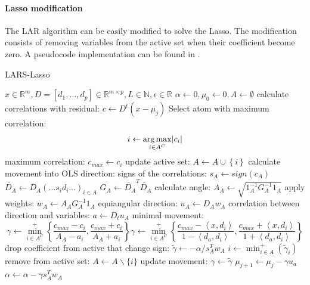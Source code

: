 \paragraph{Lasso modification}
The LAR algorithm can be easily modified to solve the Lasso. 
The modification consists of removing variables from the active set
when their coefficient become zero. A pseudocode implementation can be found in
.
\begin{algorithm}
\caption{LARS-Lasso}
\label{alg:lars}
\begin{algorithmic}[1]
\REQUIRE $x \in \mathbb{R}^m, D =[d_1,...,d_p] \in \mathbb{R}^{m\times p}, L \in
\mathbb{N}, \epsilon \in \mathbb{R}$
\STATE $\alpha \gets 0, \mu_{0} \gets 0, A \gets \emptyset$
\STATE calculate correlations with residual: $c \gets D^t\left( x-\mu_j \right)
$
\STATE Select atom with maximum correlation: 
\begin{equation*}
i \gets \argmax_{i \in A^C} \lvert c_i  \rvert %
\end{equation*}
\STATE maximum correlation: $c_{max} \gets c_i $ %
\STATE update active set: $A \gets A \cup \left\{i\right\} $
\STATE calculate movement into OLS direction:
\STATE signs of the correlations: $s_A \gets  sign\left(c_A\right)$
\STATE $\tilde{D_A} \gets D_A\left(\ldots s_id_i \ldots\right)_{i\in A}$
\STATE $G_A \gets \tilde{D_A}^T\tilde{D_A}$
\STATE calculate angle: $A_A \gets \sqrt{ 1_A^{-1} G_A^{-1} 1_A
}$
\STATE apply weights: $w_A \gets A_AG_A^{-1}1_A$
\STATE equiangular direction: $u_A \gets D_Aw_A$
\STATE correlation between direction and variables: $a \gets D_tu_A$
\STATE minimal movement:
\begin{equation*}
\gamma \gets \min_{i\in A^C}^{+} \left\lbrace \frac{c_{max}-c_i }{A_A-a_i },
\frac{c_{max}+c_i }{A_A+a_i } \right\rbrace
\gamma \gets \min_{i\in A^C}^{+} \left\lbrace \frac{c_{max}-\left< x,d_i
\right> }{1-\left< d_a,d_i \right> }, \frac{c_{max}+\left< x,d_i \right>
}{1+\left< d_a,d_i \right> } \right\rbrace
\end{equation*}
\STATE drop coefficient from active that change sign: 
\STATE $ \tilde{\gamma} \gets -\alpha/s_A^Tw_A  $
\STATE $ i \gets \min_{i\in A}^{+} \left( \tilde{\gamma}_i \right) $
\STATE remove from active set: $ A \gets A \backslash \{i\} $
\STATE update movement: $ \gamma \gets \tilde{\gamma} $  
\ENDIF
\STATE $ \mu_{j+1} \gets \mu_{j} - \gamma u_a $
\STATE $ \alpha \gets \alpha - \gamma s_A^Tw_A $
\ENDFOR
\end{algorithmic}
\end{algorithm}


